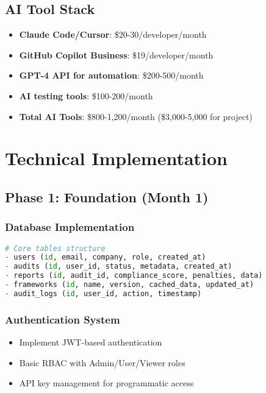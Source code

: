 \documentclass[12pt,a4paper]{report}
\begin{document}
\subsection{AI Tool Stack}
\begin{itemize}
    \item \textbf{Claude Code/Cursor}: \$20-30/developer/month
    \item \textbf{GitHub Copilot Business}: \$19/developer/month
    \item \textbf{GPT-4 API for automation}: \$200-500/month
    \item \textbf{AI testing tools}: \$100-200/month
    \item \textbf{Total AI Tools}: \$800-1,200/month (\$3,000-5,000 for project)
\end{itemize}

\section{Technical Implementation}

\subsection{Phase 1: Foundation (Month 1)}

\subsubsection{Database Implementation}
\begin{lstlisting}[language=Python, caption=PostgreSQL Schema Design]
# Core tables structure
- users (id, email, company, role, created_at)
- audits (id, user_id, status, metadata, created_at)
- reports (id, audit_id, compliance_score, penalties, data)
- frameworks (id, name, version, cached_data, updated_at)
- audit_logs (id, user_id, action, timestamp)
\end{lstlisting}

\subsubsection{Authentication System}
\begin{itemize}
    \item Implement JWT-based authentication
    \item Basic RBAC with Admin/User/Viewer roles
    \item API key management for programmatic access
\end{itemize}
\end{document}
